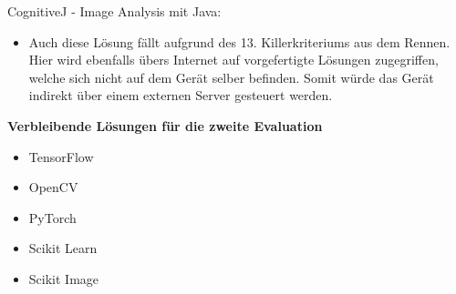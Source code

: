 CognitiveJ - Image Analysis mit Java:
\begin{itemize}
    \item Auch diese Lösung fällt aufgrund des 13. Killerkriteriums aus dem Rennen. Hier wird ebenfalls übers Internet auf vorgefertigte Lösungen zugegriffen, welche sich nicht auf dem Gerät selber befinden. Somit würde das Gerät indirekt über einem externen Server gesteuert werden.
\end{itemize}

\textbf{Verbleibende Lösungen für die zweite Evaluation}
\begin{itemize}
    \item TensorFlow 
    \item OpenCV
    \item PyTorch
    \item Scikit Learn
    \item Scikit Image
\end{itemize}

